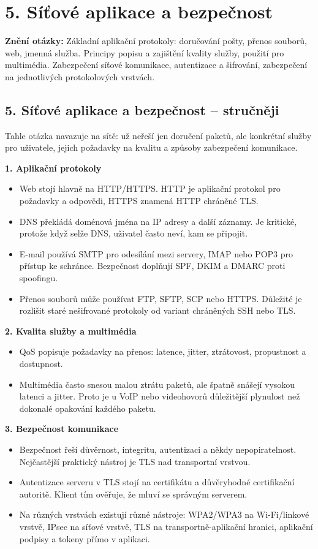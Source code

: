 \documentclass[11pt,a4paper]{article}
\newcommand{\otazka}[3]{\section*{#1}\addcontentsline{toc}{section}{#1}\noindent\textbf{Znění otázky:} #2\par\medskip}
\begin{document}
\newpage

\otazka{5. Síťové aplikace a bezpečnost}{Základní aplikační protokoly: doručování pošty, přenos souborů, web, jmenná služba. Principy popisu a zajištění kvality služby, použití pro multimédia. Zabezpečení síťové komunikace, autentizace a šifrování, zabezpečení na jednotlivých protokolových vrstvách.}{PB156}

\subsection*{5. Síťové aplikace a bezpečnost -- stručněji}
Tahle otázka navazuje na sítě: už neřeší jen doručení paketů, ale konkrétní služby pro uživatele, jejich požadavky na kvalitu a způsoby zabezpečení komunikace.

\textbf{1. Aplikační protokoly}
\begin{itemize}
  \item Web stojí hlavně na HTTP/HTTPS. HTTP je aplikační protokol pro požadavky a odpovědi, HTTPS znamená HTTP chráněné TLS.
  \item DNS překládá doménová jména na IP adresy a další záznamy. Je kritické, protože když selže DNS, uživatel často neví, kam se připojit.
  \item E-mail používá SMTP pro odesílání mezi servery, IMAP nebo POP3 pro přístup ke schránce. Bezpečnost doplňují SPF, DKIM a DMARC proti spoofingu.
  \item Přenos souborů může používat FTP, SFTP, SCP nebo HTTPS. Důležité je rozlišit staré nešifrované protokoly od variant chráněných SSH nebo TLS.
\end{itemize}

\textbf{2. Kvalita služby a multimédia}
\begin{itemize}
  \item QoS popisuje požadavky na přenos: latence, jitter, ztrátovost, propustnost a dostupnost.
  \item Multimédia často snesou malou ztrátu paketů, ale špatně snášejí vysokou latenci a jitter. Proto je u VoIP nebo videohovorů důležitější plynulost než dokonalé opakování každého paketu.
\end{itemize}

\textbf{3. Bezpečnost komunikace}
\begin{itemize}
  \item Bezpečnost řeší důvěrnost, integritu, autentizaci a někdy nepopiratelnost. Nejčastější praktický nástroj je TLS nad transportní vrstvou.
  \item Autentizace serveru v TLS stojí na certifikátu a důvěryhodné certifikační autoritě. Klient tím ověřuje, že mluví se správným serverem.
  \item Na různých vrstvách existují různé nástroje: WPA2/WPA3 na Wi-Fi/linkové vrstvě, IPsec na síťové vrstvě, TLS na transportně-aplikační hranici, aplikační podpisy a tokeny přímo v aplikaci.
\end{itemize}
\end{document}
